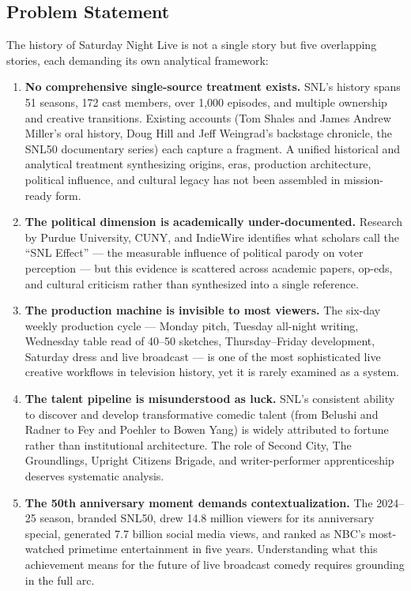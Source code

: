 \documentclass[11pt,letterpaper]{article}
\begin{document}
\subsection{Problem Statement}

The history of Saturday Night Live is not a single story but five overlapping stories, each demanding its own analytical framework:

\begin{enumerate}
  \item \textbf{No comprehensive single-source treatment exists.} SNL's history spans 51 seasons, 172 cast members, over 1,000 episodes, and multiple ownership and creative transitions. Existing accounts (Tom Shales and James Andrew Miller's oral history, Doug Hill and Jeff Weingrad's backstage chronicle, the SNL50 documentary series) each capture a fragment. A unified historical and analytical treatment synthesizing origins, eras, production architecture, political influence, and cultural legacy has not been assembled in mission-ready form.
  
  \item \textbf{The political dimension is academically under-documented.} Research by Purdue University, CUNY, and IndieWire identifies what scholars call the ``SNL Effect'' --- the measurable influence of political parody on voter perception --- but this evidence is scattered across academic papers, op-eds, and cultural criticism rather than synthesized into a single reference.
  
  \item \textbf{The production machine is invisible to most viewers.} The six-day weekly production cycle --- Monday pitch, Tuesday all-night writing, Wednesday table read of 40--50 sketches, Thursday--Friday development, Saturday dress and live broadcast --- is one of the most sophisticated live creative workflows in television history, yet it is rarely examined as a system.
  
  \item \textbf{The talent pipeline is misunderstood as luck.} SNL's consistent ability to discover and develop transformative comedic talent (from Belushi and Radner to Fey and Poehler to Bowen Yang) is widely attributed to fortune rather than institutional architecture. The role of Second City, The Groundlings, Upright Citizens Brigade, and writer-performer apprenticeship deserves systematic analysis.
  
  \item \textbf{The 50th anniversary moment demands contextualization.} The 2024--25 season, branded SNL50, drew 14.8 million viewers for its anniversary special, generated 7.7 billion social media views, and ranked as NBC's most-watched primetime entertainment in five years. Understanding what this achievement means for the future of live broadcast comedy requires grounding in the full arc.
\end{enumerate}
\end{document}
